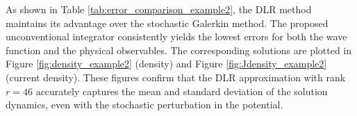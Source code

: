 \documentclass[preprint,11pt]{elsarticle}
\begin{document}
As shown in Table \ref{tab:error_comparison_example2}, the DLR method maintains its advantage over the stochastic Galerkin method. The proposed unconventional integrator consistently yields the lowest errors for both the wave function and the physical observables. The corresponding solutions are plotted in Figure \ref{fig:density_example2} (density) and Figure \ref{fig:Jdensity_example2} (current density). These figures confirm that the DLR approximation with rank $r=46$ accurately captures the mean and standard deviation of the solution dynamics, even with the stochastic perturbation in the potential.

\begin{table}[!htbp]
\centering
\caption{Error comparison for Example 2 with different ranks $r$.}
\label{tab:error_comparison_example2}
\renewcommand{\arraystretch}{1.2}
\end{table}
\end{document}
